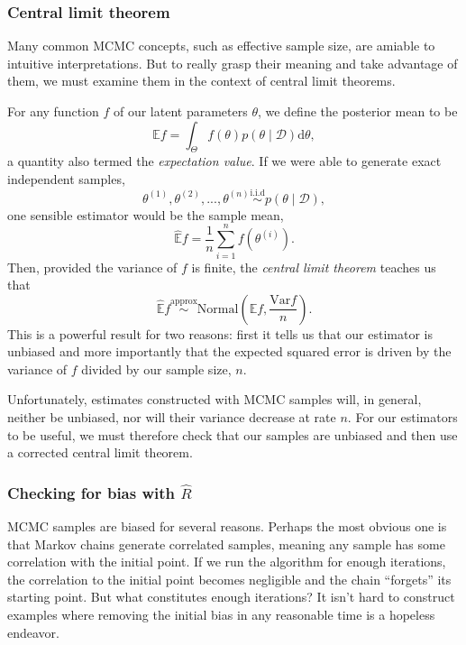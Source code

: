 \subsubsection{Central limit theorem}

Many common MCMC concepts, such as effective sample size, are amiable to intuitive interpretations.
But to really grasp their meaning and take advantage of them, we must examine them in the context of central limit theorems.

For any function $f$ of our latent parameters $\theta$, we define the posterior mean to be
\begin{equation*}
  \mathbb E f = \int_\Theta f(\theta) p(\theta \mid \mathcal D) \mathrm d \theta,
\end{equation*}
%
a quantity also termed the \textit{expectation value}.
If we were able to generate exact independent samples, 
\begin{equation*}
  \theta^{(1)}, \theta^{(2)}, ..., \theta^{(n)} \overset{\mathrm{i.i.d}}{\sim} p(\theta \mid \mathcal D),
\end{equation*}
one sensible estimator would be the sample mean,
\begin{equation*}
  \hat {\mathbb E} f = \frac{1}{n} \sum_{i = 1}^n f \left (\theta^{(i)} \right).
\end{equation*}
%
Then, provided the variance of $f$ is finite, the \textit{central limit theorem} teaches us that
\begin{equation*}
  \hat {\mathbb E} f \overset{\mathrm{approx}}{\sim} \mathrm{Normal} \left ( \mathbb E f, \frac{\mathrm{Var} f}{n} \right ).
\end{equation*}
%
This is a powerful result for two reasons: first it tells us that our estimator is unbiased and more importantly that the expected squared error is driven by the variance of $f$ divided by our sample size, $n$.

Unfortunately, estimates constructed with MCMC samples will, in general, neither be unbiased, nor will their variance decrease at rate $n$.
For our estimators to be useful, we must therefore check that our samples are unbiased and then use a corrected central limit theorem.

\subsubsection{Checking for bias with $\hat R$}

MCMC samples are biased for several reasons.
Perhaps the most obvious one is that Markov chains generate correlated samples, meaning any sample has some correlation with the initial point.
If we run the algorithm for enough iterations, the correlation to the initial point becomes negligible and the chain ``forgets'' its starting point.
But what constitutes enough iterations?
It isn't hard to construct examples where removing the initial bias in any reasonable time is a hopeless endeavor. 

